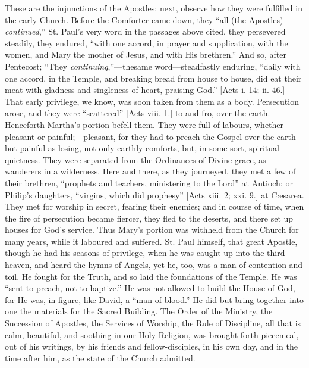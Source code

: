These are the injunctions of the Apostles; next, observe how they
were fulfilled in the early Church. Before the Comforter came down,
they ``all (the Apostles) \emph{continued},'' \emph{}St. Paul's
very word in the passages above cited, they persevered steadily, they
endured, ``with one accord, in prayer and supplication, with the
women, and Mary the mother of Jesus, and with His brethren.'' And
so, after Pentecost; ``They \emph{continuing},''—the\emph{}same
word—steadfastly enduring, ``daily with one accord, in the
Temple, and breaking bread from house to house, did eat their meat
with gladness and singleness of heart, praising God.'' [Acts i.
14; ii. 46.] That early privilege, we know, was soon taken from them
as a body. Persecution arose, and they were ``scattered''
[Acts viii. 1.] to and fro, over the earth. Henceforth Martha's
portion befell them. They were full of labours, whether pleasant or
painful;—pleasant, for they had to preach the Gospel over the earth—but
painful as losing, not only earthly comforts, but, in some sort,
spiritual quietness. They were separated from the Ordinances of Divine
grace, as wanderers in a wilderness. Here and there, as they
journeyed, they met a few of their brethren, ``prophets and
teachers, ministering to the Lord'' at Antioch; or Philip's
daughters, ``virgins, which did prophesy'' [Acts xiii. 2; xxi.
9.] at Cæsarea. They met for worship in secret, fearing their
enemies; and in course of time, when the fire of persecution became
fiercer, they fled to the deserts, and there set up houses for God's
service. Thus Mary's portion was withheld from the Church for many
years, while it laboured and suffered. St. Paul himself, that great
Apostle, though he had his seasons of privilege, when he was caught up
into the third heaven, and heard the hymns of Angels, yet he, too, was
a man of contention and toil. He fought for the Truth, and so laid the
foundations of the Temple. He was ``sent to preach, not to
baptize.'' He was not allowed to build the House of God, for He
was, in figure, like David, a ``man of blood.'' He did but
bring together into one the materials for the Sacred Building. The
Order of the Ministry, the Succession of Apostles, the Services of
Worship, the Rule of Discipline, all that is calm, beautiful, and
soothing in our Holy Religion, was brought forth piecemeal, out of his
writings, by his friends and fellow-disciples, in his own day, and in
the time after him, as the state of the Church admitted.

